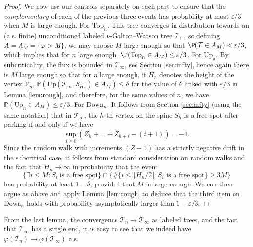 \begin{proof}
We now use our controls separately on each part to ensure that the \emph{complementary} of each of the previous three events has probability at most $\varepsilon/3$ when $M$ is large enough. 
For $ \mathrm{Top}_n$. This tree converges in distribution towards an (a.s. finite) unconditioned labeled $\nu$-Galton--Watson tree $\mathcal{T}$, \cite[Theorem 1.3]{JA16},
so defining $A=A_M= \{ \varphi > M \}$, we may choose $M$ large enough so that 
$\P(\mathcal{T} \in A_M) < \varepsilon/3$, which implies that for $n$ large enough, $\P(\mathrm{Top}_{n} \in A_M) \leq \varepsilon /3$. 
For $\mathrm{Up}_n$. By subcriticality, the flux is bounded in $\mathcal T_{\infty}$, see Section  \ref{sec:infty}, hence again there is $M$ large enough so that for $n$ large enough, if $H_n$ denotes the height of the vertex $\mathcal{V}_n$, $\mathbb{P}\left(
\mathrm{Up}(  \mathcal{T}_{\infty}, S_{H_{n}}) \in A_M \right) \leq \delta$ for the value of $\delta$ linked with $\varepsilon/3$ in Lemma \ref{lem:rough}, and therefore, for the same values of $n$,  we have $\mathbb{P}\left(\mathrm{Up}_n \in A_M \right) \leq \varepsilon/3$. 
For  $\mathrm{Down}_n$. It follows from Section \ref{sec:infty} (using the same notation) that in $ \mathcal{T}_{\infty}$, the $h$-th vertex on the spine $S_{h}$ is a free spot after parking if and only if we have 
$$ \sup_{i \geq 0} (Z_{h}+ \dots + Z_{h+i} - (i+1)) = -1.$$
Since the random walk with increments $(Z-1)$ has a strictly negative drift in the subcritical case, it follows from standard consideration on random walks  and the fact that $H_{n} \to \infty$ in probability that the event 
$$ \{ \exists i \leq M: S_{i} \mbox{ is a free spot}\} \cap \{ \# \{i  \leq \lfloor H_{n}/2 \rfloor  : S_{i} \mbox{ is a free spot}\} \geq 3 M\}$$
has probability at least $1- \delta$, provided that $M$ is large enough. We can then argue as above and apply Lemma \ref{lem:rough} to deduce that the third item on $ \mathrm{Down}_{n}$ holds with probability  asymptotically larger than $1 - \varepsilon/3$. 
\end{proof}
From the last lemma, the convergence $ \mathcal{T}_n \to \mathcal{T}_\infty$ as labeled trees, and the fact that $ \mathcal{T}_\infty$ has a single end, it is easy to see that we indeed have $ \varphi(\mathcal{T}_n) \to \varphi(\mathcal{T}_\infty)$ a.s. 
